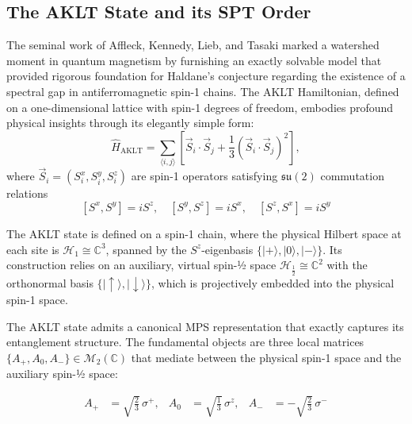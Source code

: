 \documentclass[12pt,a4paper]{article}
\begin{document}
\subsection{The AKLT State and its  SPT Order}\label{SbSect_AKLT}

The seminal work of Affleck, Kennedy, Lieb, and Tasaki \cite{Affleck1988} marked a watershed moment in quantum magnetism by furnishing an exactly solvable model that provided rigorous foundation for Haldane's conjecture regarding the existence of a spectral gap in antiferromagnetic spin-1 chains. The AKLT Hamiltonian, defined on a one-dimensional lattice with spin-1 degrees of freedom, embodies profound physical insights through its elegantly simple form:
\[
\hat{H}_{\text{AKLT}} = \sum_{\langle i,j \rangle} \left[ \vec{S}_i \cdot \vec{S}_j + \frac{1}{3} (\vec{S}_i \cdot \vec{S}_j)^2 \right],
\]
where \(\vec{S}_i = (S_i^x, S_i^y, S_i^z)\) are spin-1 operators satisfying \(\mathfrak{su}(2)\) commutation relations
\[
[S^x, S^y]  = iS^z, \quad [S^y, S^z]  = iS^x, \quad [S^z, S^x]  = iS^y
\]



The AKLT state is defined on a spin-1 chain, where the physical Hilbert space at each site is $\mathcal{H}_1 \cong \mathbb{C}^3$, spanned by the $S^z$-eigenbasis $\{|+\rangle, |0\rangle, |-\rangle\}$. Its construction relies on an auxiliary, virtual spin-½ space $\mathcal{H}_{\frac{1}{2}} \cong \mathbb{C}^2$ with the orthonormal basis $\{|\uparrow\rangle, |\downarrow\rangle\}$, which is projectively embedded into the physical spin-1 space.

The AKLT state admits a canonical MPS  representation that exactly captures its entanglement structure. The fundamental objects are three local matrices $\{A_+, A_0, A_-\} \in \mathcal{M}_2(\mathbb{C})$ that mediate between the physical spin-1 space and the auxiliary spin-½ space:

\begin{align}\label{eq:Ak}
A_{+} &= \sqrt{\frac{2}{3}} \, \sigma^{+}, &
A_{0} &= \sqrt{\frac{1}{3}} \, \sigma^{z}, &
A_{-} &= -\sqrt{\frac{2}{3}} \, \sigma^{-}
\end{align}
\end{document}

